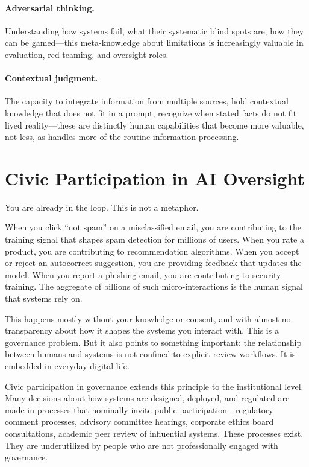 \paragraph{Adversarial thinking.} Understanding how \ai systems fail, what their systematic blind spots are, how they can be gamed---this meta-knowledge about \ai limitations is increasingly valuable in evaluation, red-teaming, and oversight roles.

\paragraph{Contextual judgment.} The capacity to integrate information from multiple sources, hold contextual knowledge that does not fit in a prompt, recognize when stated facts do not fit lived reality---these are distinctly human capabilities that become more valuable, not less, as \ai handles more of the routine information processing.

\section{Civic Participation in AI Oversight}
\label{sec:ch19-civic}

You are already in the loop. This is not a metaphor.

When you click ``not spam'' on a misclassified email, you are contributing to the training signal that shapes spam detection for millions of users. When you rate a product, you are contributing to recommendation algorithms. When you accept or reject an autocorrect suggestion, you are providing feedback that updates the model. When you report a phishing email, you are contributing to security \ai training. The aggregate of billions of such micro-interactions is the human signal that \ai systems rely on.

This happens mostly without your knowledge or consent, and with almost no transparency about how it shapes the \ai systems you interact with. This is a governance problem. But it also points to something important: the relationship between humans and \ai systems is not confined to explicit review workflows. It is embedded in everyday digital life.

Civic participation in \ai governance extends this principle to the institutional level. Many decisions about how \ai systems are designed, deployed, and regulated are made in processes that nominally invite public participation---regulatory comment processes, advisory committee hearings, corporate ethics board consultations, academic peer review of influential \ai systems. These processes exist. They are underutilized by people who are not professionally engaged with \ai governance.


